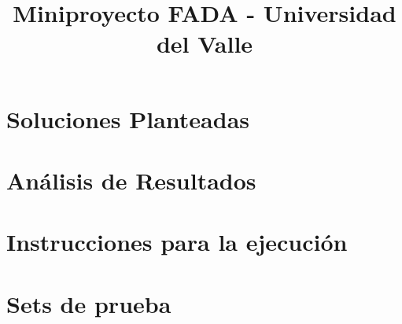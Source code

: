 \documentclass{article}
\title{Miniproyecto FADA - Universidad del Valle}
\date{}
\author{}
\begin{document}
	\maketitle

	\section{Soluciones Planteadas}

	\section{Análisis de Resultados}

	\section{Instrucciones para la ejecución}

	\section{Sets de prueba}
\end{document}
